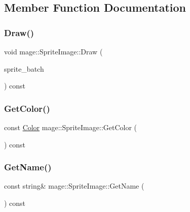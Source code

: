 \subsection{Member Function Documentation}
\hypertarget{classmage_1_1_sprite_image_ae30d3293931f674fea17008063755bb6}{}\label{classmage_1_1_sprite_image_ae30d3293931f674fea17008063755bb6} 
\subsubsection{\texorpdfstring{Draw()}{Draw()}}
{\footnotesize\ttfamily void mage\+::\+Sprite\+Image\+::\+Draw (\begin{DoxyParamCaption}\item[{\hyperlink{classmage_1_1_sprite_batch}{Sprite\+Batch} \&}]{sprite\+\_\+batch }\end{DoxyParamCaption}) const}

\hypertarget{classmage_1_1_sprite_image_a33dff0d92d5b6505da004ea3587dd0ff}{}\label{classmage_1_1_sprite_image_a33dff0d92d5b6505da004ea3587dd0ff} 
\subsubsection{\texorpdfstring{Get\+Color()}{GetColor()}}
{\footnotesize\ttfamily const \hyperlink{structmage_1_1_color}{Color} mage\+::\+Sprite\+Image\+::\+Get\+Color (\begin{DoxyParamCaption}{ }\end{DoxyParamCaption}) const}

\hypertarget{classmage_1_1_sprite_image_a916f6afbb6d48b1feb4dd80740b7ce08}{}\label{classmage_1_1_sprite_image_a916f6afbb6d48b1feb4dd80740b7ce08} 
\subsubsection{\texorpdfstring{Get\+Name()}{GetName()}}
{\footnotesize\ttfamily const string\& mage\+::\+Sprite\+Image\+::\+Get\+Name (\begin{DoxyParamCaption}{ }\end{DoxyParamCaption}) const}

